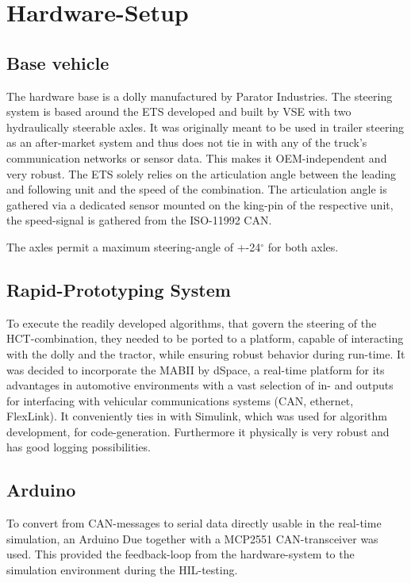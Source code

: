\documentclass[root.tex]{subfiles}
\begin{document}
{\pagestyle{empty}}
\section{Hardware-Setup}
\label{chap:Hardware-Setup}
\subsection{Base vehicle}
\label{sec:basevehicle}

The hardware base is a dolly manufactured by Parator Industries. The steering system is based around the \gls{ETS} developed and built by \gls{VSE} with two hydraulically steerable axles. It was originally meant to be used in trailer steering as an after-market system and thus does not tie in with any of the truck's communication networks or sensor data. This makes it OEM-independent and very robust. The \gls{ETS} solely relies on the articulation angle between the leading and following unit and the speed of the combination. The articulation angle is gathered via a dedicated sensor mounted on the king-pin of the respective unit, the speed-signal is gathered from the ISO-11992 \gls{CAN}. 

The axles permit a maximum steering-angle of +-24$^\circ$ for both axles. 
\subsection{Rapid-Prototyping System}

To execute the readily developed algorithms\cite{c27}, that govern the steering of the \gls{HCT}-combination, they needed to be ported to a platform, capable of interacting with the dolly and the tractor, while ensuring robust behavior during run-time. It was decided to incorporate the \gls{MABII} by dSpace, a real-time platform for its advantages in automotive environments with a vast selection of in- and outputs for interfacing with vehicular communications systems (\gls{CAN}, ethernet, FlexLink). It conveniently ties in with Simulink, which was used for algorithm development, for code-generation. Furthermore it physically is very robust and has good logging possibilities.


\subsection{Arduino}

To convert from \gls{CAN}-messages to serial data directly usable in the real-time simulation, an Arduino Due together with a MCP2551 \gls{CAN}-transceiver was used. This provided the feedback-loop from the hardware-system to the simulation environment during the \gls{HIL}-testing. 
\end{document}
